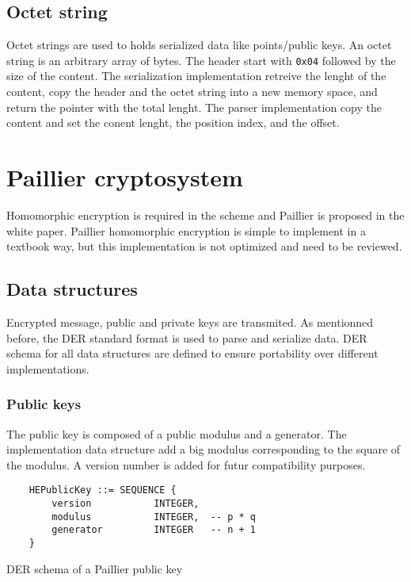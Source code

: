 \subsection{Octet string}

Octet strings are used to holds serialized data like points/public keys.
An octet string is an arbitrary array of bytes. The header start with \texttt{0x04}
followed by the size of the content. The serialization implementation retreive
the lenght of the content, copy the header and the octet string into a new memory
space, and return the pointer with the total lenght. The parser implementation
copy the content and set the conent lenght, the position index, and the offset.


\section{Paillier cryptosystem}

Homomorphic encryption is required in the scheme and Paillier is proposed in the
white paper. Paillier homomorphic encryption is simple to implement in a textbook
way, but this implementation is not optimized and need to be reviewed.

\subsection{Data structures}

Encrypted message, public and private keys are transmited. As mentionned before,
the DER standard format is used to parse and serialize data. DER schema for all
data structures are defined to ensure portability over different implementations.

\subsubsection{Public keys}

The public key is composed of a public modulus and a generator. The implementation
data structure add a big modulus corresponding to the square of the modulus. A
version number is added for futur compatibility purposes.

\begin{listing}
  \begin{verbatim}
    HEPublicKey ::= SEQUENCE {
        version           INTEGER,
        modulus           INTEGER,  -- p * q
        generator         INTEGER   -- n + 1
    }
  \end{verbatim}
	\caption{DER schema of a Paillier public key}
	\label{lst:DERSchemaPaillierPub}
\end{listing}

